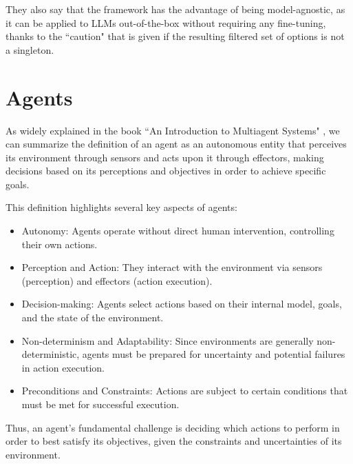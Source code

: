 They also say that the framework has the advantage of being model-agnostic, as
it can be applied to LLMs out-of-the-box without requiring any fine-tuning, thanks
to the ``caution" that is given if the resulting filtered set of options is not
a singleton.

\section{Agents}
\label{sec:agents}


As widely explained in the book ``An Introduction to Multiagent Systems" \cite{wooldridge2002multiagent},
we can summarize the definition of an agent as an autonomous entity that
perceives its environment through sensors and acts upon it through effectors, making
decisions based on its perceptions and objectives in order to achieve specific goals.

This definition highlights several key aspects of agents:
\begin{itemize}
  \item Autonomy: Agents operate without direct human intervention, controlling their
    own actions.

  \item Perception and Action: They interact with the environment via sensors (perception)
    and effectors (action execution).

  \item Decision-making: Agents select actions based on their internal model, goals,
    and the state of the environment.

  \item Non-determinism and Adaptability: Since environments are generally non-deterministic,
    agents must be prepared for uncertainty and potential failures in action execution.

  \item Preconditions and Constraints: Actions are subject to certain conditions
    that must be met for successful execution.
\end{itemize}

Thus, an agent's fundamental challenge is deciding which actions to perform in
order to best satisfy its objectives, given the constraints and uncertainties of
its environment.

